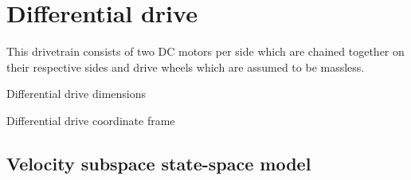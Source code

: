 \section{Differential drive}
\label{sec:ss_model_differential_drive}

This drivetrain consists of two DC motors per side which are chained together on
their respective sides and drive wheels which are assumed to be massless.
\begin{bookfigure}
  \begin{bookminifig}{2}
    
    \caption{Differential drive dimensions}
  \end{bookminifig}
  \begin{bookminifig}{2}
    
    \caption{Differential drive coordinate frame}
  \end{bookminifig}
\end{bookfigure}

\subsection{Velocity subspace state-space model}

